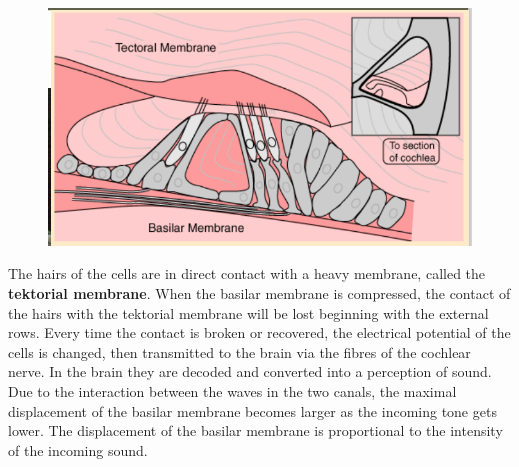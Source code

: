 	\begin{figure}
	\vspace{-5mm}
	\includegraphics[scale=0.35]{acoustics/ch2/3}
	\label{fig:2.3}
	\end{figure}
	 The hairs of the cells are in direct contact with a heavy membrane, called the \textbf{tektorial membrane}. When the basilar membrane is compressed, the contact of the hairs with the tektorial membrane will be lost beginning with the external rows. Every time the contact is broken or recovered, the electrical potential of the cells is changed, then transmitted to the brain via the fibres of the cochlear nerve. In the brain they are decoded and converted into a perception of sound. Due to the interaction between the waves in the two canals, the maximal displacement of the basilar membrane becomes larger as the incoming tone gets lower. The displacement of the basilar membrane is proportional to the intensity of the incoming sound. 